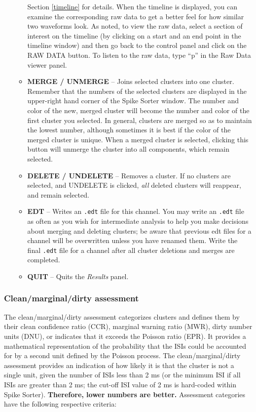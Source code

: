 \documentclass[12pt]{article}
\begin{document}
\begin{itemize}
\begin{itemize}
  Section \ref{timeline} for details. When the timeline is displayed,
  you can examine the corresponding raw data to get a better feel for
  how similar two waveforms look. As noted, to view the raw data,
  select a section of interest on the timeline (by clicking on a start
  and an end point in the timeline window) and then go back to the
  control panel and click on the {\sf RAW DATA} button. To listen to
  the raw data, type ``p'' in the Raw Data viewer panel.
\item \textbf{\textsf{MERGE} / \textsf{UNMERGE}} -- Joins selected
  clusters into one cluster. Remember that the numbers of the selected
  clusters are displayed in the upper-right hand corner of the Spike
  Sorter window. The number and color of the new, merged cluster will
  become the number and color of the first cluster you selected. In
  general, clusters are merged so as to maintain the lowest number,
  although sometimes it is best if the color of the merged cluster is
  unique. When a merged cluster is selected, clicking this button will
  unmerge the cluster into all components, which remain selected.
\item \textbf{\textsf{DELETE} / \textsf{UNDELETE}} -- Removes a
  cluster. If no clusters are selected, and {\sf UNDELETE} is clicked,
  \textit{all} deleted clusters will reappear, and remain selected.
\item \textbf{\textsf{EDT}} -- Writes an {\tt *.edt} file for this
  channel. You may write an {\tt .edt} file as often as you wish for
  intermediate analysis to help you make decisions about merging and
  deleting clusters; be aware that previous edt files for a channel
  will be overwritten unless you have renamed them. Write the final
  {\tt .edt} file for a channel after all cluster deletions and merges
  are completed.
\item \textbf{\textsf{QUIT}} -- Quits the \textit{Results }panel.
\end{itemize}
\end{itemize}

\subsubsection{Clean/marginal/dirty assessment}
\label{cmd}
The clean/marginal/dirty assessment categorizes clusters and defines
them by their clean confidence ratio (CCR), marginal warning ratio
(MWR), dirty number units (DNU), or indicates that it exceeds the
Poisson ratio (EPR). It provides a mathematical representation of the
probability that the ISIs could be accounted for by a second unit
defined by the Poisson process. The clean/marginal/dirty assessment
provides an indication of how likely it is that the cluster is not a
single unit, given the number of ISIs less than 2 ms (or the minimum
ISI if all ISIs are greater than 2 ms; the cut-off ISI value of 2 ms
is hard-coded within Spike Sorter).  \textbf{Therefore, lower numbers
  are better.} Assessment categories have the following respective
criteria:
\end{document}
